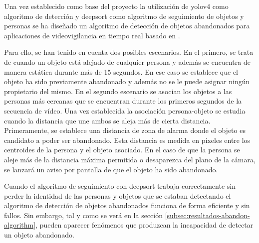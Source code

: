 Una vez establecido como base del proyecto la utilización de \gls{yolov4} como algoritmo de detección y \gls{deepsort} como algoritmo de seguimiento de objetos y personas se ha diseñado un algoritmo de detección de objetos abandonados para aplicaciones de videovigilancia en tiempo real basado en \cite{valdivieso2018}.

Para ello, se han tenido en cuenta dos posibles escenarios. En el primero, se trata de cuando un objeto está alejado de cualquier persona y además se encuentra de manera estática durante más de 15 segundos. En ese caso se establece que el objeto ha sido previamente abandonado y además no se le puede asignar ningún propietario del mismo. En el segundo escenario se asocian los objetos a las personas más cercanas que se encuentran durante los primeros segundos de la secuencia de vídeo. Una vez establecida la asociación persona-objeto se estudia cuando la distancia que une ambos se aleja más de cierta distancia. Primeramente, se establece una distancia de zona de alarma donde el objeto es candidato a poder ser abandonado. Esta distancia es medida en píxeles entre los centroides de la persona y el objeto asociado. En el caso de que la persona se aleje más de la distancia máxima permitida o desaparezca del plano de la cámara, se lanzará un aviso por pantalla de que el objeto ha sido abandonado.

Cuando el algoritmo de seguimiento con \gls{deepsort} trabaja correctamente sin perder la identidad de las personas y objetos que se estaban detectando el algoritmo de detección de objetos abandonados funciona de forma eficiente y sin fallos. Sin embargo, tal y como se verá en la sección \ref{subsec:resultados-abandon-algorithm}, pueden aparecer fenómenos que produzcan la incapacidad de detectar un objeto abandonado.